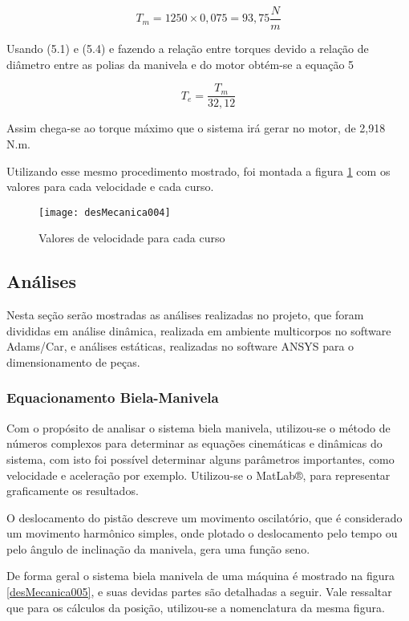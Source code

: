 	
		$$T_{m}= {1250 \times 0,075} = 93,75 {\frac{N}{m}}$$
	

		Usando (5.1) e (5.4) e fazendo a relação entre torques devido a relação de diâmetro entre as polias da manivela e do motor obtém-se a equação 5

		\begin{equation}
			T_{e}= {\frac{T_{m}}{32,12}}
		\end{equation}

		Assim chega-se ao torque máximo que o sistema irá gerar no motor, de 2,918 N.m.

		Utilizando esse mesmo procedimento mostrado, foi montada a figura \ref{desMecanica004} com os valores para cada velocidade e cada curso.

		\begin{figure}[h]
			\centering
			\texttt{[image: desMecanica004]}
			\caption{Valores de velocidade para cada curso}
			\label{desMecanica004}
		\end{figure}

\subsection{Análises}
	
	Nesta seção serão mostradas as análises realizadas no projeto, que foram divididas em análise dinâmica, realizada em ambiente multicorpos no software  Adams/Car, e análises estáticas, realizadas no software ANSYS para o dimensionamento de peças. 

	\subsubsection{Equacionamento Biela-Manivela}

		Com o propósito de analisar o sistema biela manivela, utilizou-se o método de números complexos para determinar as equações cinemáticas e dinâmicas do sistema, com isto foi possível determinar alguns parâmetros importantes, como velocidade e aceleração por exemplo. Utilizou-se o MatLab®, para representar graficamente os resultados.

		O deslocamento do pistão descreve um movimento oscilatório, que é considerado um movimento harmônico simples, onde plotado o deslocamento pelo tempo ou pelo ângulo de inclinação da manivela, gera uma função seno.

		De forma geral o sistema biela manivela de uma máquina é mostrado na figura \ref{desMecanica005}, e suas devidas partes são detalhadas a seguir. Vale ressaltar que para os cálculos da posição, utilizou-se a nomenclatura da mesma figura.

